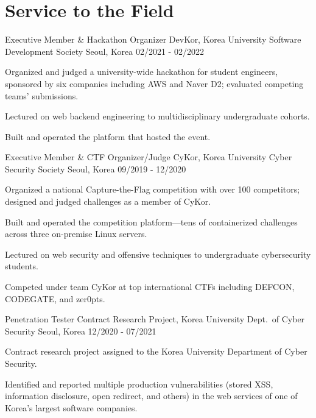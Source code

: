 \section{Service to the Field}

\cventry
{Executive Member \& Hackathon Organizer} %
{DevKor, Korea University Software Development Society} %
{Seoul, Korea} %
{02/2021 - 02/2022} %
\begin{cvitems}
\item {Organized and judged a university-wide hackathon for student engineers, sponsored by six companies including AWS and Naver D2; evaluated competing teams' submissions.}
\item {Lectured on web backend engineering to multidisciplinary undergraduate cohorts.}
\item {Built and operated the platform that hosted the event.}
\end{cvitems}

\cventry
{Executive Member \& CTF Organizer/Judge} %
{CyKor, Korea University Cyber Security Society} %
{Seoul, Korea} %
{09/2019 - 12/2020} %
\begin{cvitems}
\item {Organized a national Capture-the-Flag competition with over 100 competitors; designed and judged challenges as a member of CyKor.}
\item {Built and operated the competition platform---tens of containerized challenges across three on-premise Linux servers.}
\item {Lectured on web security and offensive techniques to undergraduate cybersecurity students.}
\item {Competed under team CyKor at top international CTFs including DEFCON, CODEGATE, and zer0pts.}
\end{cvitems}

\cventry
{Penetration Tester} %
{Contract Research Project, Korea University Dept.\ of Cyber Security} %
{Seoul, Korea} %
{12/2020 - 07/2021} %
\begin{cvitems}
\item {Contract research project assigned to the Korea University Department of Cyber Security.}
\item {Identified and reported multiple production vulnerabilities (stored XSS, information disclosure, open redirect, and others) in the web services of one of Korea's largest software companies.}
\end{cvitems}

